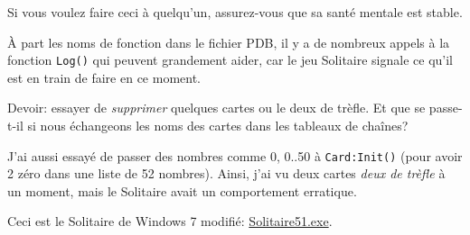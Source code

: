 Si vous voulez faire ceci à quelqu'un, assurez-vous que sa santé mentale est stable.

À part les noms de fonction dans le fichier PDB, il y a de nombreux appels à la
fonction \verb|Log()| qui peuvent grandement aider,
car le jeu Solitaire signale ce qu'il est en train de faire en ce moment.

Devoir: essayer de \textit{supprimer} quelques cartes ou le deux de trèfle.
Et que se passe-t-il si nous échangeons les noms des cartes dans les tableaux de
chaînes?

J'ai aussi essayé de passer des nombres comme 0, 0..50 à \verb|Card:Init()| (pour
avoir 2 zéro dans une liste de 52 nombres).
Ainsi, j'ai vu deux cartes \textit{deux de trèfle} à un moment, mais le Solitaire
avait un comportement erratique.

Ceci est le Solitaire de Windows 7 modifié:
\href{\RepoURL/examples/solitaire/51/Solitaire51.exe}{Solitaire51.exe}.

